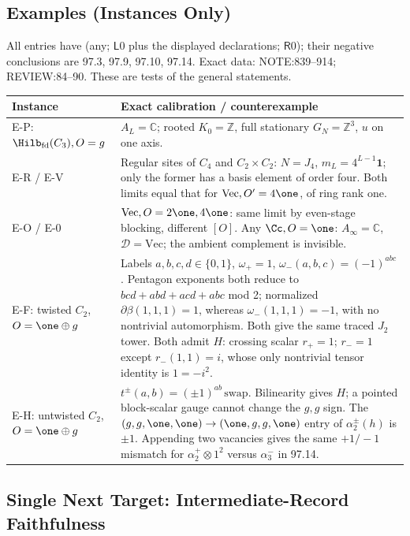 \subsection{Examples (Instances Only)}
All entries have (any; \(\mathsf L0\) plus the displayed declarations; \(\mathsf R0\)); their negative conclusions are
97.3, 97.9, 97.10, 97.14. Exact data: NOTE:839--914; REVIEW:84--90. These are tests of the general statements.
\begin{center}\footnotesize
\begin{tabular}{p{2.4cm}p{11.7cm}}\toprule
Instance & Exact calibration / counterexample \\\midrule
\raggedright E-P: \(\Hilb_{\mathrm{fd}}(C_3),O=g\) & \(A_L=\mathbb C\); rooted \(K_0=\mathbb Z\), full stationary \(G_N=\mathbb Z^3\), \(u\) on one axis. \\
E-R / E-V & Regular sites of \(C_4\) and \(C_2\times C_2\): \(N=J_4\), \(m_L=4^{L-1}\mathbf1\); only the former has a basis element of order four. Both limits equal that for \(\mathrm{Vec},O'=4\one\), of ring rank one. \\
E-O / E-0 & \(\mathrm{Vec},O=2\one,4\one\): same limit by even-stage blocking, different \([O]\). Any \(\Cc,O=\one\): \(A_\infty=\mathbb C\), \(\mathcal D=\mathrm{Vec}\); the ambient complement is invisible. \\
E-F: twisted \(C_2\), \(O=\one\oplus g\) & Labels \(a,b,c,d\in\{0,1\}\), \(\omega_+=1\), \(\omega_-(a,b,c)=(-1)^{abc}\). Pentagon exponents both reduce to \(bcd+abd+acd+abc\) mod 2; normalized \(\partial\beta(1,1,1)=1\), whereas \(\omega_-(1,1,1)=-1\), with no nontrivial automorphism. Both give the same traced \(J_2\) tower. Both admit \(H\): crossing scalar \(r_+=1\); \(r_-=1\) except \(r_-(1,1)=i\), whose only nontrivial tensor identity is \(1=-i^2\). \\
\raggedright E-H: untwisted \(C_2\), \(O=\one\oplus g\) & \(t^\pm(a,b)=(\pm1)^{ab}\,\mathrm{swap}\). Bilinearity gives \(H\); a pointed block-scalar gauge cannot change the \(g,g\) sign. The \((g,g,\one,\one)\to(\one,g,g,\one)\) entry of \(\alpha_2^\pm(h)\) is \(\pm1\). Appending two vacancies gives the same \(+1/-1\) mismatch for \(\alpha_2^+\otimes1^2\) versus \(\alpha_3^-\) in 97.14. \\\bottomrule
\end{tabular}
\end{center}

\subsection{Single Next Target: Intermediate-Record Faithfulness}

